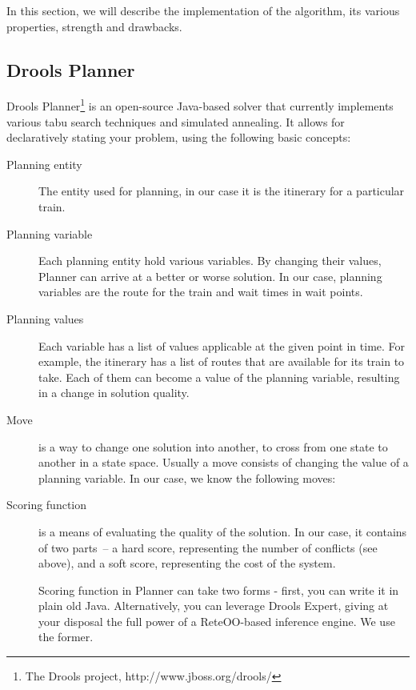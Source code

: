 \documentclass[10pt,a4paper,final]{article}
\begin{document}
In this section, we will describe the implementation of the algorithm, its various properties, strength and drawbacks.

\subsection{Drools Planner} 

Drools Planner\footnote{The Drools project, http://www.jboss.org/drools/} is an open-source Java-based solver that currently implements various tabu search techniques and simulated annealing. It allows for declaratively stating your problem, using the following basic concepts:

\begin{description}
\item[Planning entity] The entity used for planning, in our case it is the itinerary for a particular train.

\item[Planning variable] Each planning entity hold various variables. By changing their values, Planner can arrive at a better or worse solution. In our case, planning variables are the route for the train and wait times in wait points.

\item[Planning values] Each variable has a list of values applicable at the given point in time. For example, the itinerary has a list of routes that are available for its train to take. Each of them can become a value of the planning variable, resulting in a change in solution quality.

\item[Move] is a way to change one solution into another, to cross from one state to another in a state space. Usually a move consists of changing the value of a planning variable. In our case, we know the following moves:

\item[Scoring function] is a means of evaluating the quality of the solution. In our case, it contains of two parts~-- a hard score, representing the number of conflicts (see above), and a soft score, representing the cost of the system.

Scoring function in Planner can take two forms - first, you can write it in plain old Java. Alternatively, you can leverage Drools Expert, giving at your disposal the full power of a ReteOO-based inference engine. We use the former.

\end{description}
\end{document}
